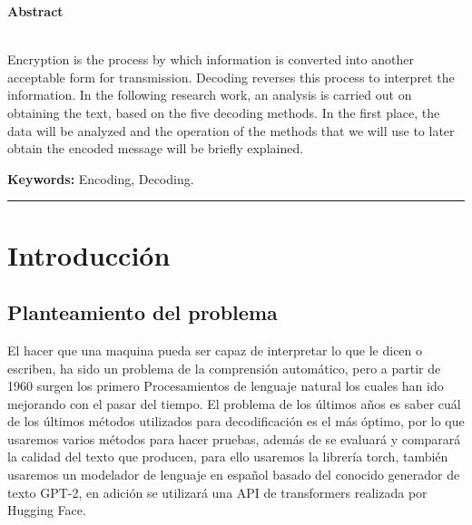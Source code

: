 \documentclass[10pt,twocolumn]{article}
\theoremstyle{definition}
\begin{document}
\begin{abstract*}
{\small
\hspace*{0.5cm}

\begin{center}
    \textbf{Abstract}
\end{center}

\\
Encryption is the process by which information is converted into another acceptable form for transmission. Decoding reverses this process to interpret the information. In the following research work, an analysis is carried out on obtaining the text, based on the five decoding methods. In the first place, the data will be analyzed and the operation of the methods that we will use to later obtain the encoded message will be briefly explained.

\textbf{Keywords:} Encoding, Decoding.
}

\end{abstract*}


\tableofcontents

\vspace{20pt}
\hrule
\vspace{10pt}



\section{Introducción}

\subsection{Planteamiento del problema}
El hacer que una maquina pueda ser capaz de interpretar lo que le dicen o escriben, ha sido un problema de la comprensión automático, pero a partir de 1960 surgen los primero Procesamientos de lenguaje natural los cuales han ido mejorando con el pasar del tiempo.  El problema de los últimos años es saber cuál de los últimos métodos utilizados para decodificación es el más óptimo, por lo que usaremos varios métodos para hacer pruebas, además de se evaluará y comparará la calidad del texto que producen, para ello usaremos la librería torch, también usaremos un modelador de lenguaje en español basado del conocido generador de texto GPT-2, en adición se utilizará una API de transformers realizada por Hugging Face.
\end{document}
